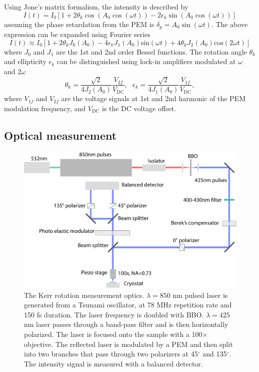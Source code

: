 \documentclass[pdflatex, sectionletters, 12pt]{pittetd}    %
\begin{document}
Using Jone's matrix formalism, the intensity is described by\cite{bennemann1998non}
$$
I(t) = I_0[1 + 2\theta_k \cos(A_0 \cos(\omega t)) - 2\epsilon_k \sin(A_0 \cos(\omega t))]
$$
assuming the phase retardation from the PEM is $\delta_p = A_0 \sin(\omega t)$. The above expression can be expanded using Fourier series
$$
I(t) \approx I_0[1+2\theta_k J_0(A_0) - 4\epsilon_k J_1(A_0)\mathrm{sin}(\omega t) + 4\theta_k J_2(A_0)\mathrm{cos}(2\omega t)]
$$
where $J_0$ and $J_1$ are the 1st and 2nd order Bessel functions. The rotation angle $\theta_k$ and ellipticity $\epsilon_k$ can be distinguished using lock-in amplifiers modulated at $\omega$ and $2\omega$
$$
\theta_k = \frac{\sqrt{2}}{4J_2(A_0)}\frac{V_{2f}}{V_{\mathrm{DC}}}, \ \ \ 
\epsilon_k = \frac{\sqrt{2}}{4J_1(A_0)}\frac{V_{1f}}{V_{\mathrm{DC}}},
$$
where $V_{1f}$ and $V_{2f}$ are the voltage signals at 1st and 2nd harmonic of the PEM modulation frequency, and $V_\mathrm{DC}$ is the DC voltage offset.

\subsection{Optical measurement}

\begin{figure}[p]
	\centering
	\includegraphics[width=.9\textwidth]{Drawing/KerrOptics.pdf}
	\caption{The Kerr rotation measurement optics. $\lambda = 850$ nm pulsed laser is generated from a Tsunami oscillator, at 78 MHz repetition rate and 150 fs duration. The laser frequency is doubled with BBO. $\lambda = 425$ nm laser passes through a band-pass filter and is then horizontally polarized. The laser is focused onto the sample with a 100$\times$ objective. The reflected laser is modulated by a PEM and then split into two branches that pass through two polarizers at 45$^{\circ}$ and 135$^{\circ}$. The intensity signal is measured with a balanced detector.}
	\label{FIG:KerrOptics}
\end{figure}
\end{document}
